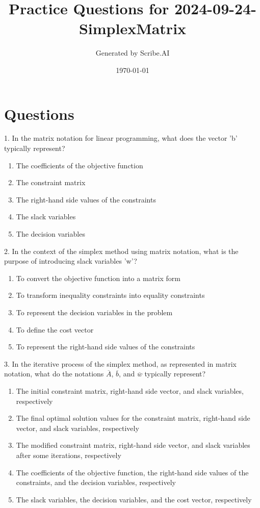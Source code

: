 \documentclass{article}%
\title{Practice Questions for 2024{-}09{-}24{-}SimplexMatrix}%
\author{Generated by Scribe.AI}%
\date{\today}%
\begin{document}
%
\normalsize%
\maketitle%
\section{Questions}%
\label{sec:Questions}%
1. In the matrix notation for linear programming, what does the vector 'b' typically represent?%
\begin{enumerate}[label=\Alph*.]%
\item The coefficients of the objective function%
\item The constraint matrix%
\item The right-hand side values of the constraints%
\item The slack variables%
\item The decision variables%
\end{enumerate}%
\vspace{1em}%
2. In the context of the simplex method using matrix notation, what is the purpose of introducing slack variables 'w'?%
\begin{enumerate}[label=\Alph*.]%
\item To convert the objective function into a matrix form%
\item To transform inequality constraints into equality constraints%
\item To represent the decision variables in the problem%
\item To define the cost vector%
\item To represent the right-hand side values of the constraints%
\end{enumerate}%
\vspace{1em}%
3. In the iterative process of the simplex method, as represented in matrix notation, what do the notations $\overline{A}$, $\overline{b}$, and $\overline{w}$ typically represent?%
\begin{enumerate}[label=\Alph*.]%
\item The initial constraint matrix, right-hand side vector, and slack variables, respectively%
\item The final optimal solution values for the constraint matrix, right-hand side vector, and slack variables, respectively%
\item The modified constraint matrix, right-hand side vector, and slack variables after some iterations, respectively%
\item The coefficients of the objective function, the right-hand side values of the constraints, and the decision variables, respectively%
\item The slack variables, the decision variables, and the cost vector, respectively%
\end{enumerate}%
\vspace{1em}
\end{document}
